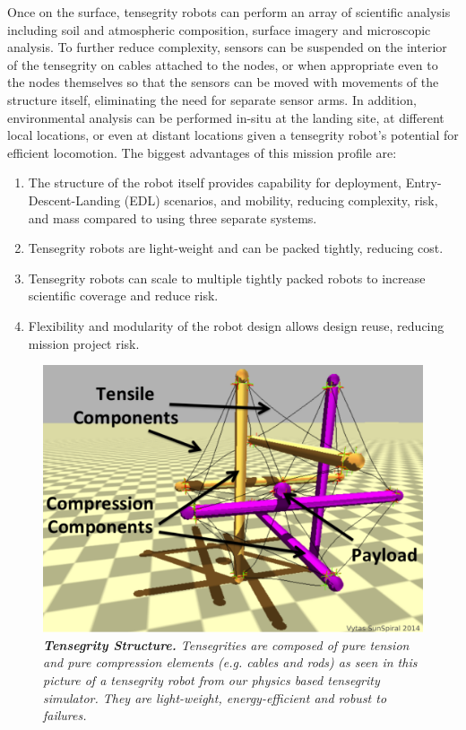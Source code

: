 Once on the surface, tensegrity robots can perform an array of scientific analysis including soil and atmospheric composition, surface imagery and microscopic analysis. To further reduce complexity, sensors can be suspended on the interior of the tensegrity on cables attached to the nodes, or when appropriate even to the nodes themselves so that the sensors can be moved with movements of the structure itself, eliminating the need for separate sensor arms. In addition, environmental analysis can be performed in-situ at the landing site, at different local locations, or even at distant locations given a tensegrity robot's potential for efficient locomotion. The biggest advantages of this mission profile are:
\begin{enumerate}[leftmargin=.5cm]
\item The structure of the robot itself provides capability for deployment, Entry-Descent-Landing (EDL) scenarios, and mobility, reducing complexity, risk, and mass compared to using three separate systems.
\item Tensegrity robots are light-weight and can be packed tightly, reducing cost.
\item Tensegrity robots can scale to multiple tightly packed robots to increase scientific coverage and reduce risk.
\item Flexibility and modularity of the robot design allows design reuse, reducing mission project risk.
\end{enumerate}

 \begin{figure}[h]
   \centering
   \includegraphics[width=0.5\columnwidth]{tex/img/fig_basic_diagram}
   \caption{{\em {\bf Tensegrity Structure.} Tensegrities are composed of pure tension and pure compression elements (e.g. cables and rods) as seen in this picture of a tensegrity robot from our physics based tensegrity simulator. They are light-weight, energy-efficient and robust to failures.}}
   \label{fig:basic_diagram1}
\end{figure}

